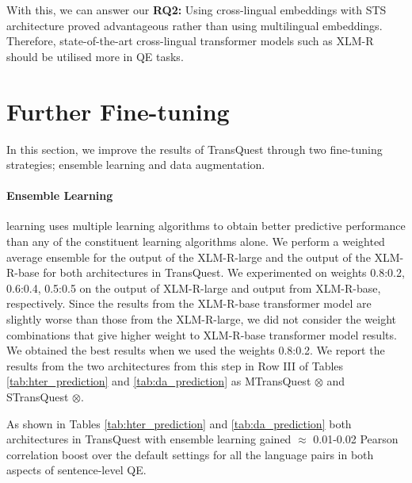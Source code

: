 With this, we can answer our \textbf{RQ2:} Using cross-lingual embeddings with STS architecture proved advantageous rather than using multilingual embeddings. Therefore, state-of-the-art cross-lingual transformer models such as XLM-R should be utilised more in QE tasks. 


\section{Further Fine-tuning}
\label{sec:transquest_finetune}
In this section, we improve the results of TransQuest through two fine-tuning strategies; ensemble learning and data augmentation. 

\paragraph{Ensemble Learning} learning uses multiple learning algorithms to obtain better predictive performance than any of the constituent learning algorithms alone. We perform a weighted average ensemble for the output of the XLM-R-large and the output of the XLM-R-base for both architectures in TransQuest. We experimented on weights 0.8:0.2, 0.6:0.4, 0.5:0.5 on the output of XLM-R-large and output from XLM-R-base, respectively. Since the results from the XLM-R-base transformer model are slightly worse than those from the XLM-R-large, we did not consider the weight combinations that give higher weight to XLM-R-base transformer model results. We obtained the best results when we used the weights 0.8:0.2. We report the results from the two architectures from this step in Row III of Tables \ref{tab:hter_prediction} and \ref{tab:da_prediction} as MTransQuest $\otimes$ and STransQuest $\otimes$.

As shown in Tables \ref{tab:hter_prediction} and \ref{tab:da_prediction} both architectures in TransQuest with ensemble learning gained $\approx$ 0.01-0.02 Pearson correlation boost over the default settings for all the language pairs in both aspects of sentence-level QE.  

